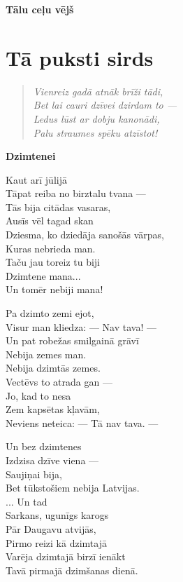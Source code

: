 \documentclass[11pt]{article}
\begin{document}
\begin{center}
{\LARGE \bf Tālu ceļu vējš}
\end{center}



\section{Tā puksti sirds}

\begin{quote}
{\em
Vienreiz gadā atnāk brīži tādi,\\
Bet lai cauri dzīvei dzirdam to ---\\
Ledus lūst ar dobju kanonādi,\\
Palu straumes spēku atzīstot!
}
\end{quote}

{\bf Dzimtenei}

Kaut arī jūlijā\\
Tāpat reiba no birztalu tvana ---\\
Tās bija citādas vasaras,\\
Ausīs vēl tagad skan\\
Dziesma, ko dziedāja sanošās vārpas,\\
Kuras nebrieda man.\\
Taču jau toreiz tu biji\\
Dzimtene mana...\\
Un tomēr nebiji mana!

Pa dzimto zemi ejot,\\
Visur man kliedza: --- Nav tava! ---\\
Un pat robežas smilgainā grāvī\\
Nebija zemes man.\\
Nebija dzimtās zemes.\\
Vectēvs to atrada gan ---\\
Jo, kad to nesa\\
Zem kapsētas kļavām,\\
Neviens neteica: --- Tā nav tava. ---

Un bez dzimtenes\\
Izdzisa dzīve viena ---\\
Saujiņai bija,\\
Bet tūkstošiem nebija Latvijas.\\
... Un tad\\
Sarkans, ugunīgs karogs\\
Pār Daugavu atvijās,\\
Pirmo reizi kā dzimtajā\\
Varēja dzimtajā birzī ienākt\\
Tavā pirmajā dzimšanas dienā.
\end{document}
